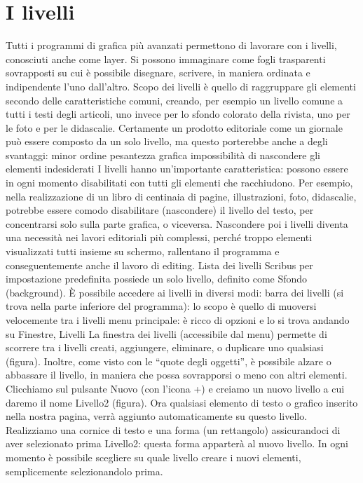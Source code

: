 \documentclass[a4paper, 12pt]{book}
\begin{document}
\section{I livelli}
Tutti i programmi di grafica più avanzati permettono di lavorare con i livelli, conosciuti anche come layer. Si possono immaginare come fogli trasparenti sovrapposti su cui è possibile disegnare, scrivere, in maniera ordinata e indipendente l'uno dall'altro. Scopo dei livelli è quello di raggruppare gli elementi secondo delle caratteristiche comuni, creando, per esempio un livello comune a tutti i testi degli articoli, uno invece per lo sfondo colorato della rivista, uno per le foto e per le didascalie. Certamente un prodotto editoriale come un giornale può essere composto da un solo livello, ma questo porterebbe anche a degli svantaggi:
minor ordine
pesantezza grafica
impossibilità di nascondere gli elementi indesiderati
I livelli hanno un'importante caratteristica: possono essere in ogni momento disabilitati con tutti gli elementi che racchiudono. Per esempio, nella realizzazione di un libro di centinaia di pagine, illustrazioni, foto, didascalie, potrebbe essere comodo disabilitare (nascondere) il livello del testo, per concentrarsi solo sulla parte grafica, o viceversa. Nascondere poi i livelli diventa una necessità nei lavori editoriali più complessi, perché troppo elementi visualizzati tutti insieme su schermo, rallentano il programma e conseguentemente anche il lavoro di editing.
Lista dei livelli
Scribus per impostazione predefinita possiede un solo livello, definito come Sfondo (background). È possibile accedere ai livelli in diversi modi:
barra dei livelli (si trova nella parte inferiore del programma): lo scopo è quello di muoversi velocemente tra i livelli
menu principale: è ricco di opzioni e lo si trova andando su Finestre, Livelli
La finestra dei livelli (accessibile dal menu) permette di scorrere tra i livelli creati, aggiungere, eliminare, o duplicare uno qualsiasi (figura). Inoltre, come visto con le “quote degli oggetti”, è possibile alzare o abbassare il livello, in maniera che possa sovrapporsi o meno con altri elementi.
Clicchiamo sul pulsante Nuovo (con l'icona +) e creiamo un nuovo livello a cui daremo il nome Livello2 (figura). Ora qualsiasi elemento di testo o grafico inserito nella nostra pagina, verrà aggiunto automaticamente su questo livello. Realizziamo una cornice di testo e una forma (un rettangolo) assicurandoci di aver selezionato prima Livello2: questa forma apparterà al nuovo livello.  In ogni momento è possibile scegliere su quale livello creare i nuovi elementi, semplicemente selezionandolo prima.
\end{document}
